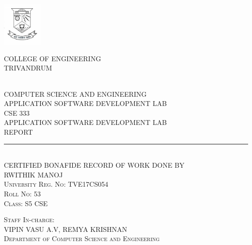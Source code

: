 \documentclass[10pt,a4paper,titlepage]{report}
\newcommand{\HRule}[1]{\rule{\linewidth}{#1}}
\begin{document}



\begin{titlepage}
\vfill
\begin{center}
\includegraphics[width=2cm]{../Images/index.jpeg}
\\[1cm]
\begin{LARGE}
\uppercase{College of Engineering}
\\[0.3cm]
\uppercase{Trivandrum}
\end{LARGE}
\\[1.5cm]
\uppercase{Computer science and engineering}
\\[0.2cm]
\uppercase{Application software development lab}
\\[0.5cm]
{\Large CSE 333}
\\[1cm]
{\Large\uppercase{Application software development lab \\[0.1cm] report}}
\HRule{0.01cm}
\\[0.5cm]
\uppercase{Certified bonafide record of work done by}
\\[0.5cm]
\uppercase{Rwithik Manoj}
\\[0.4cm]
\textsc{University Reg. No: TVE17CS054}
\\[0.4cm]
\textsc{Roll No: 53}
\\[0.4cm]
\textsc{Class: S5 CSE}
\end{center}
\vfill
\textsc{Staff In-charge:}\\[0.4cm]
VIPIN VASU A.V, REMYA KRISHNAN\\[0.4cm]
\textsc{Department of Computer Science and Engineering}
\end{titlepage}
\end{document}
